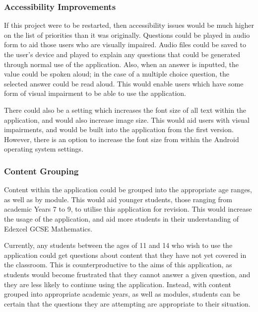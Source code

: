 \documentclass{article}
\begin{document}
\subsubsection{Accessibility Improvements}

If this project were to be restarted, then accessibility issues would be much higher on the list of priorities than it was originally. Questions could be played in audio form to aid those users who are visually impaired. Audio files could be saved to the user's device and played to explain any questions that could be generated through normal use of the application. Also, when an answer is inputted, the value could be spoken aloud; in the case of a multiple choice question, the selected answer could be read aloud. This would enable users which have some form of visual impairment to be able to use the application. \par

There could also be a setting which increases the font size of all text within the application, and would also increase image size. This would aid users with visual impairments, and would be built into the application from the first version. However, there is an option to increase the font size from within the Android operating system settings. \par

\subsubsection{Content Grouping}

Content within the application could be grouped into the appropriate age ranges, as well as by module. This would aid younger students, those ranging from academic Years 7 to 9, to utilise this application for revision. This would increase the usage of the application, and aid more students in their understanding of Edexcel GCSE Mathematics. \par

Currently, any students between the ages of 11 and 14 who wish to use the application could get questions about content that they have not yet covered in the classroom. This is counterproductive to the aims of this application, as students would become frustrated that they cannot answer a given question, and they are less likely to continue using the application. Instead, with content grouped into appropriate academic years, as well as modules, students can be certain that the questions they are attempting are appropriate to their situation. \par
\end{document}
